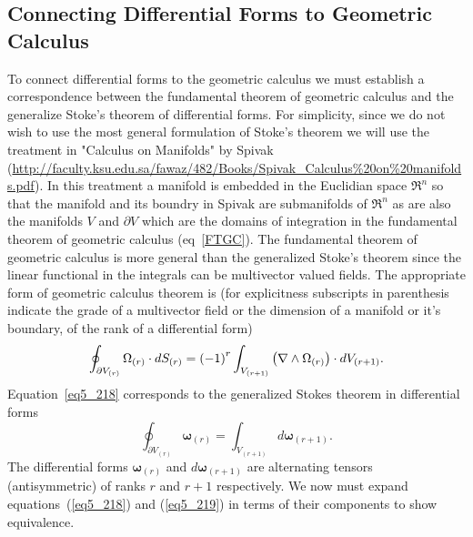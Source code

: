 \subsection{Connecting Differential Forms to Geometric Calculus}
To connect differential forms to the geometric calculus we must establish a correspondence between the fundamental theorem of
geometric calculus and the generalize Stoke's theorem of differential forms.  For simplicity, since we do not wish to use the most
general formulation of Stoke's theorem we will use the treatment in "Calculus on Manifolds" by Spivak (\url{http://faculty.ksu.edu.sa/fawaz/482/Books/Spivak_Calculus%20on%20manifolds.pdf}).  In this treatment a manifold is embedded in
the Euclidian space $\Re^{n}$ so that the manifold and its boundry in Spivak are  submanifolds of $\Re^{n}$ as are also the manifolds 
$V$ and $\partial V$ which are the domains of integration in the fundamental theorem of geometric calculus (eq~\ref{FTGC}). The
fundamental theorem of geometric calculus is more general than the generalized Stoke's theorem since the linear functional in the 
integrals can be multivector valued fields.  The appropriate form of geometric calculus theorem is (for explicitness subscripts in
parenthesis indicate the grade of a multivector field or the dimension of a manifold or it's boundary, of the rank of a differential
form)
\begin{equation}\label{eq5_218}
	\oint_{\partial V_{(r)}} \Omega_{(r)} \cdot dS_{(r)} = 
		\left ( {-1} \right )^{r}\int_{V_{(r+1)}} \left ( {\nabla\wedge\Omega_{(r)}} \right )\cdot dV_{(r+1)}. 
\end{equation}
Equation~\ref{eq5_218} corresponds to the generalized Stokes theorem in differential forms
\begin{equation}\label{eq5_219}
	\oint_{\partial V_{(r)}} \bm{\omega}_{(r)} = \int_{V_{(r+1)}} d\bm{\omega}_{(r+1)}.
\end{equation}  The differential forms $\bm{\omega}_{(r)}$ and $d\bm{\omega}_{(r+1)}$ are alternating tensors (antisymmetric) of ranks 
$r$ and $r+1$ respectively.  We now must expand equations~(\ref{eq5_218}) and (\ref{eq5_219}) in terms of their components to show
equivalence.

